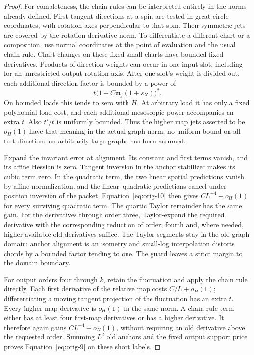 \begin{proof}
For completeness, the chain rules can be interpreted entirely in the
norms already defined.  First tangent directions at a spin are tested
in great-circle coordinates, with rotation axes perpendicular to that
spin.  Their symmetric jets are covered by the rotation-derivative
norm.  To differentiate a different chart or a composition, use
normal coordinates at the point of evaluation and the usual chain
rule.  Chart changes on these fixed small charts have bounded fixed
derivatives.  Products of direction weights can occur in one input
slot, including for an unrestricted output rotation axis.  After
one slot's weight is divided out, each additional direction factor
is bounded by a power of
\[
 t\bigl(1+C\mathfrak m_j(1+s_X)\bigr)^8.
\]
On bounded loads this tends to zero with $H$.  At arbitrary load it
has only a fixed polynomial load cost, and each additional mesoscopic
power accompanies an extra $t$.  Also $t'/t$ is uniformly bounded.
Thus the higher map jets asserted to be $o_H(1)$ have that meaning
in the actual graph norm; no uniform bound on all test directions
on arbitrarily large graphs has been assumed.

Expand the invariant error at alignment.  Its constant and first
terms vanish, and its affine Hessian is zero.  Tangent inversion in
the anchor stabilizer makes its cubic term zero.  In the quadratic
term, the two linear spatial predictions vanish by affine
normalization, and the linear--quadratic predictions cancel under
position inversion of the packet.  Equation~\eqref{eq:orig-10} then
gives $CL^{-4}+o_H(1)$ for every surviving quadratic term.  The
quartic Taylor remainder has the same gain.  For the derivatives
through order three, Taylor-expand the required derivative with the
corresponding reduction of order; fourth and, where needed, higher
available old derivatives suffice.  The Taylor segments stay in the
old graph domain: anchor alignment is an isometry and small-log
interpolation distorts chords by a bounded factor tending to one.
The guard leaves a strict margin to the domain boundary.

For output orders four through $k$, retain the fluctuation and apply
the chain rule directly.  Each first derivative of the relative map
costs $C/L+o_H(1)$; differentiating a moving tangent projection of the
fluctuation has an extra $t$.  Every higher map derivative is
$o_H(1)$ in the same norm.  A chain-rule term either has at least four
first-map derivatives or has a higher derivative.  It therefore
again gains $CL^{-4}+o_H(1)$, without requiring an old derivative
above the requested order.  Summing $L^2$ old anchors and the fixed
output support price proves Equation~\eqref{eq:orig-9} on these
short labels.


\end{proof}
